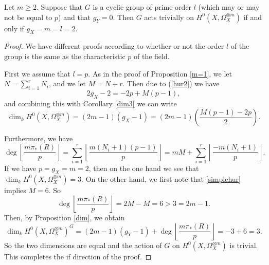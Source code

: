     \begin{prop}\label{triv}
    Let $m \geq 2$. 
    Suppose that $G$ is a cyclic group of prime order $l$ (which may or may not be equal to $p$) and that $g_Y=0$. 
    Then $G$ acts trivially on $H^0(X,\Omega_X^{\otimes m})$ if and only if $g_X=m=l=2$.
    \end{prop}
    \begin{proof}
    We have different proofs according to whether or not the order $l$ of the group is the same as the characteristic $p$ of the field.
    
    
    First we assume that $l=p$. 
    As in the proof of Proposition \ref{m=1}, we let $N=\sum_{i=1}^r N_i$, and we let $M=N+r$.
    Then due to (\ref{hur2}) we have
        \begin{equation}\label{simplehur}
        2g_X-2=-2p+M(p-1),
        \end{equation}
    and combining this with Corollary \ref{dim3} we can write
        \begin{equation}\label{altdim2}
        \dim_kH^0(X,\Omega_X^{\otimes m})=(2m-1)(g_X-1)=(2m-1)\left(\frac{M(p-1)-2p}{2}\right).
        \end{equation}
    
    Furthermore, we have
        \begin{equation}\label{altdim}
        \deg\left\lfloor \frac{m\pi_*(R)}{p} \right\rfloor = \sum_{i=1}^r\left\lfloor \frac{m(N_i+1)(p-1)}{p} \right\rfloor  = mM + \sum_{i=1}^r\left\lfloor \frac{-m(N_i+1)}{p} \right\rfloor.
        \end{equation}
    If we have $p=g_X=m=2$, then on the one hand we see that $\dim_kH^0(X,\Omega_X^{\otimes m}) =3$. 
    On the other hand, we first note that \eqref{simplehur} implies $M=6$.
    So 
        \begin{equation*}
        \deg\left\lfloor \frac{m\pi_*(R)}{p}\right\rfloor = 2M -M =6 > 3 = 2m-1.
        \end{equation*}  
    Then, by Proposition \ref{dim}, we obtain 
        \begin{equation*}
        \dim_kH^0(X,\Omega_X^{\otimes m})^G = (2m-1)(g_Y-1)+\deg\left\lfloor \frac{m\pi_*(R)}{p} \right\rfloor = -3 + 6 = 3.
        \end{equation*}
    So the two dimensions are equal and the action of $G$ on $H^0(X,\Omega_X^{\otimes m})$ is trivial. 
    This completes the if direction of the proof.
    

\end{proof}
